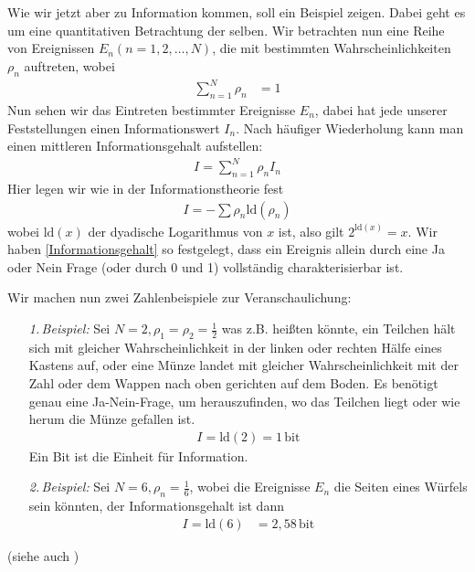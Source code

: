 \documentclass[ngerman]{scrartcl}
\begin{document}
Wie wir jetzt aber zu Information kommen, soll ein Beispiel zeigen. Dabei geht es um eine quantitativen Betrachtung der selben.
Wir betrachten nun eine Reihe von Ereignissen $E_n (n = 1, 2, \ldots, N)$, die mit bestimmten Wahrscheinlichkeiten $\rho_n$ auftreten, wobei
	\begin{align}
		\sum_{n=1}^N \rho_n &= 1
	\end{align}
Nun sehen wir das Eintreten bestimmter Ereignisse $E_n$, dabei hat jede unserer Feststellungen einen Informationswert $I_n$. Nach häufiger Wiederholung kann man einen mittleren Informationsgehalt aufstellen:
	\begin{align}
		I = \sum_{n=1}^N \rho_n I_n
	\end{align}
Hier legen wir wie in der Informationstheorie fest
	\begin{align} \label{Informationsgehalt}
		I = - \sum \rho_n \mathrm{ld}(\rho_n)
	\end{align}
wobei $\mathrm{ld}(x)$ der dyadische Logarithmus von $x$ ist, also gilt $2^{\mathrm{ld}(x)} = x$. 
Wir haben \eqref{Informationsgehalt} so festgelegt, dass ein Ereignis allein durch eine Ja oder Nein Frage (oder durch 0 und 1) vollständig charakterisierbar ist. 

Wir machen nun zwei Zahlenbeispiele zur Veranschaulichung:
	\begin{itemize}
		\item[\textit{1.\,Beispiel:}] Sei $N=2, \rho_1 = \rho_2= \frac{1}{2}$ was z.B. heißten könnte, ein Teilchen hält sich mit gleicher Wahrscheinlichkeit in der linken oder rechten Hälfe eines Kastens auf, oder eine Münze landet mit gleicher Wahrscheinlichkeit mit der Zahl oder dem Wappen nach oben gerichten auf dem Boden.
		Es benötigt genau eine Ja-Nein-Frage, um herauszufinden, wo das Teilchen liegt oder wie herum die Münze gefallen ist.
			\begin{align*}
				I = \mathrm{ld}(2) = 1 \,\mathrm{bit}
			\end{align*}
		Ein Bit ist die Einheit für Information.
		\item[\textit{2.\,Beispiel:}]Sei $N=6, \rho_n = \frac{1}{6}$, wobei die Ereignisse $E_n$ die Seiten eines Würfels sein könnten, der Informationsgehalt ist dann
			\begin{align*}
				I = \mathrm{ld}(6) &= 2,58 \,\mathrm{bit}
			\end{align*}
	\end{itemize}
(siehe auch \cite{Brenig})
\end{document}
